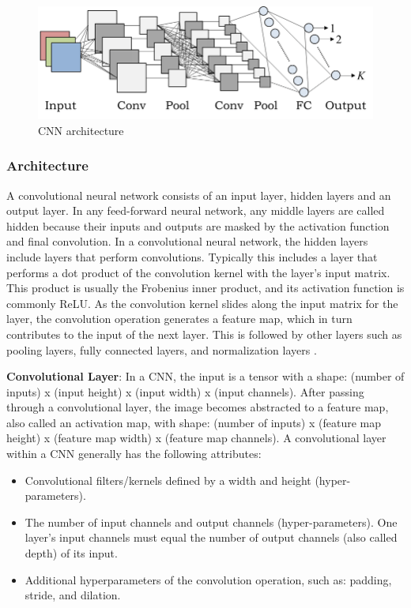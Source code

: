 \documentclass[10pt]{report}
\begin{document}
	\begin{figure}[h]
		\centering
		\includegraphics[width=0.8\linewidth]{imgs/cnn_arch.png}
		\caption{CNN architecture}%
		\label{CNN Architecture}
	\end{figure}

	\subsubsection{Architecture}

	A convolutional neural network consists of an input layer, hidden layers and
	an output layer. In any feed-forward neural network, any middle layers are
	called hidden because their inputs and outputs are masked by the activation
	function and final convolution. In a convolutional neural network, the
	hidden layers include layers that perform convolutions. Typically this
	includes a layer that performs a dot product of the convolution kernel with
	the layer's input matrix.  This product is usually the Frobenius inner
	product, and its activation function is commonly ReLU. As the convolution
	kernel slides along the input matrix for the layer, the convolution
	operation generates a feature map, which in turn contributes to the input of
	the next layer. This is followed by other layers such as pooling layers,
	fully connected layers, and normalization layers \cite{covnet_arch}.

	\textbf{Convolutional Layer}:
	In a CNN, the input is a tensor with a shape: (number of inputs) x (input
	height) x (input width) x (input channels). After passing through a
	convolutional layer, the image becomes abstracted to a feature map, also
	called an activation map, with shape: (number of inputs) x (feature map
	height) x (feature map width) x (feature map channels). A convolutional
	layer within a CNN generally has the following attributes:

	\begin{itemize}
		\item Convolutional filters/kernels defined by a width and height (hyper-parameters).
		\item The number of input channels and output channels
			(hyper-parameters). One layer's input channels must equal the number
			of output channels (also called depth) of its input.
		\item Additional hyperparameters of the convolution operation, such as:
			padding, stride, and dilation.
	\end{itemize}
\end{document}
